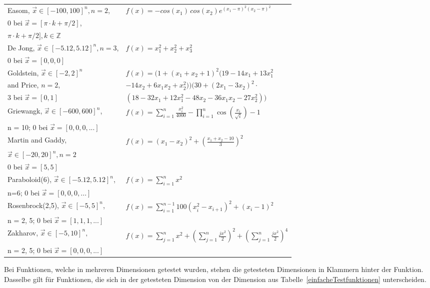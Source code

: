 \documentclass[fontsize=12, a4aper]{scrartcl}
\newcommand\Tstrut{\rule{0pt}{3ex}}           %
\begin{document}
\begin{table}[H]
\begin{tabularx}{\textwidth}{l|l}
			Easom, \(\overrightarrow{x} \in [-100,100]^n, n = 2\), & \(f(x)=-cos(x_1) \, cos(x_2) e^{(x_1-\pi)^2(x_2-\pi)^2}\)\Tstrut\\
			0 bei \(\overrightarrow{x} = [\pi \cdot k + \pi/2]\), & \\
			\( \pi \cdot k + \pi/2], k \in \mathbb{Z}\) & \\
			
			De Jong, \(\overrightarrow{x} \in [-5.12,5.12]^n, n = 3\),
			& \(f(x)=x_1^2 + x_2^2 + x_3^2\)\Tstrut\\
			0 bei \(\overrightarrow{x} = [0, 0, 0]\) &\\
			
			Goldstein, \(\overrightarrow{x} \in [-2,2]^n\) & \(f(x)=(1 + (x_1 + x_2 + 1)^2 (19 - 14x_1 + 13x_1^2\)\Tstrut\\
			and Price, \(n = 2\), & \( - 14x_2 + 6x_1x_2 + x_2^2))(30 + (2x_1 - 3x_2)^2 \cdot\)\\
			3 bei \(\overrightarrow{x} = [0,1]\) & \((18 - 32x_1 + 12x_1^2 - 48x_2 - 36x_1x_2 - 27x_2^2))\)\\
			
			Griewangk, \(\overrightarrow{x} \in [-600, 600]^n\), & \(f(x)=\sum_{i=1}^{n} \frac{x_i^2}{4000} - \prod_{i=1}^{n} \cos(\frac{x_i}{\sqrt{i}}) - 1\)\Tstrut\\
			 n = 10; 0 bei \(\overrightarrow{x} = [0, 0, 0, ...]\) & \\
			
			Martin and Gaddy, & \(f(x)=(x_1-x_2)^2 + \left(\frac{x_1+x_2-10}{3}\right)^2\)\Tstrut\\
			\(\overrightarrow{x} \in [-20, 20]^n, n = 2\) & \\
			0 bei \(\overrightarrow{x} = [5, 5]\) & \\
			
			Paraboloid(6), \(\overrightarrow{x} \in [-5.12, 5.12]^n\), & \(f(x)=\sum_{i=1}^{n} x^2\)\Tstrut\\
			n=6; 0 bei \(\overrightarrow{x} = [0, 0, 0, ...]\)& \\
			
			Rosenbrock(2,5), \(\overrightarrow{x} \in [-5,5]^n\),  & \(f(x)=\sum_{i=1}^{n-1} 100 (x^2_i-x_{i+1})^2  + (x_i-1)^2\) \Tstrut\\
			n = 2, 5; 0 bei \(\overrightarrow{x} = [1, 1, 1, ...]\) & \\
			
			Zakharov, \(\overrightarrow{x} \in [-5,10]^n,\) & \(f(x)=\sum_{j=1}^{n} x^2 + \left(\sum_{j=1}^{n} \frac{jx^2}{2}\right)^2 + \left(\sum_{j=1}^{n} \frac{jx^2}{2}\right)^4\)\Tstrut\\
			n = 2, 5; 0 bei \(\overrightarrow{x} = [0, 0, 0, ...]\)
			
		\end{tabularx}
		
		\smallskip
		
		Bei Funktionen, welche in mehreren Dimensionen getestet wurden, stehen die getesteten Dimensionen in Klammern hinter der Funktion. Dasselbe gilt für Funktionen, die sich in der getesteten Dimension von der Dimension aus Tabelle~\ref{einfacheTestfunktionen} unterscheiden.
		
	\end{table}
\end{document}
